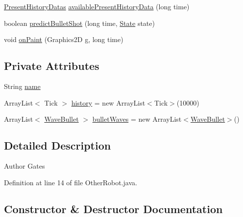 \begin{DoxyCompactItemize}
\item 
\hyperlink{enummega_1_1boirlerplate_1_1_other_robot_1_1_present_history_datas}{Present\+History\+Datas} \hyperlink{classmega_1_1boirlerplate_1_1_other_robot_ab54d46bcbd65a37cd3e755eefc21250d}{available\+Present\+History\+Data} (long time)
\item 
boolean \hyperlink{classmega_1_1boirlerplate_1_1_other_robot_a41146518d02943fb92e8b469d4d070ca}{predict\+Bullet\+Shot} (long time, \hyperlink{classmega_1_1boirlerplate_1_1_state}{State} state)
\item 
void \hyperlink{classmega_1_1boirlerplate_1_1_other_robot_a483011f9f4a11f78ee29e26b29e9d377}{on\+Paint} (Graphics2D g, long time)
\end{DoxyCompactItemize}
\subsection*{Private Attributes}
\begin{DoxyCompactItemize}
\item 
String \hyperlink{classmega_1_1boirlerplate_1_1_other_robot_ac6f8d81032357e6a08992ddb2dc84cb4}{name}
\item 
Array\+List$<$ Tick $>$ \hyperlink{classmega_1_1boirlerplate_1_1_other_robot_a41d199da2bfe68124c73c6b78abd3fe9}{history} = new Array\+List$<$Tick$>$(10000)
\item 
Array\+List$<$ \hyperlink{classmega_1_1boirlerplate_1_1_wave_bullet}{Wave\+Bullet} $>$ \hyperlink{classmega_1_1boirlerplate_1_1_other_robot_a5c6ab319f3f8a0a356705be5bf222a82}{bullet\+Waves} = new Array\+List$<$\hyperlink{classmega_1_1boirlerplate_1_1_wave_bullet}{Wave\+Bullet}$>$()
\end{DoxyCompactItemize}


\subsection{Detailed Description}
\begin{DoxyAuthor}{Author}
Gates 
\end{DoxyAuthor}


Definition at line 14 of file Other\+Robot.\+java.



\subsection{Constructor \& Destructor Documentation}
\mbox{\label{classmega_1_1boirlerplate_1_1_other_robot_a7fd120d31a5e16fd77e29a26d9473051}} 
